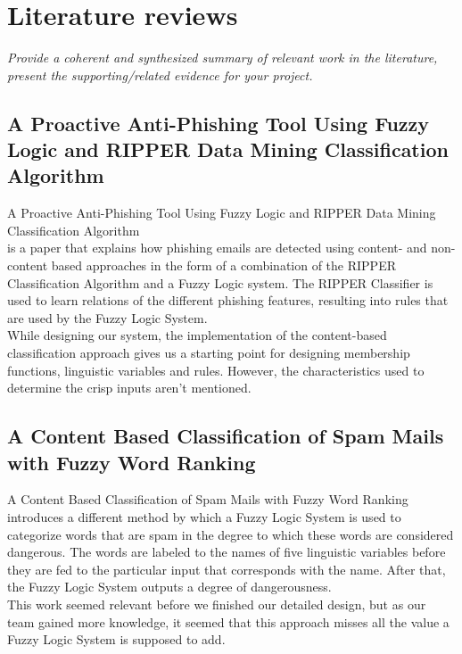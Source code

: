 \documentclass[journal]{IEEEtran}
\begin{document}
\section{Literature reviews}

\textit{Provide a coherent and synthesized summary of relevant work in the
literature, present the supporting/related evidence for your project.} \\

\subsection{A Proactive Anti-Phishing Tool Using Fuzzy Logic and RIPPER Data Mining Classification Algorithm}

A Proactive Anti-Phishing Tool Using Fuzzy Logic and RIPPER Data Mining Classification Algorithm \cite{phishing} \\ is a paper that explains how phishing emails are detected using content- and non-content based approaches in the form of a combination of the RIPPER Classification Algorithm and a Fuzzy Logic system. The RIPPER Classifier is used to learn relations of the different phishing features, resulting into rules that are used by the Fuzzy Logic System. \\

While designing our system, the implementation of the content-based classification approach gives us a starting point for designing membership functions, linguistic variables and rules. However, the characteristics used to determine the crisp inputs aren't mentioned.

\subsection{A Content Based Classification of Spam Mails with Fuzzy Word Ranking}

A Content Based Classification of Spam Mails with Fuzzy Word Ranking
\cite{spam} introduces a different method by which a Fuzzy Logic System is used to categorize words that are spam in the degree to which these words are considered dangerous. The words are labeled to the names of five linguistic variables before they are fed to the particular input that corresponds with the name. After that, the Fuzzy Logic System outputs a degree of dangerousness. \\

This work seemed relevant before we finished our detailed design, but as our team gained more knowledge, it seemed that this approach misses all the value a Fuzzy Logic System is supposed to add.
\end{document}
